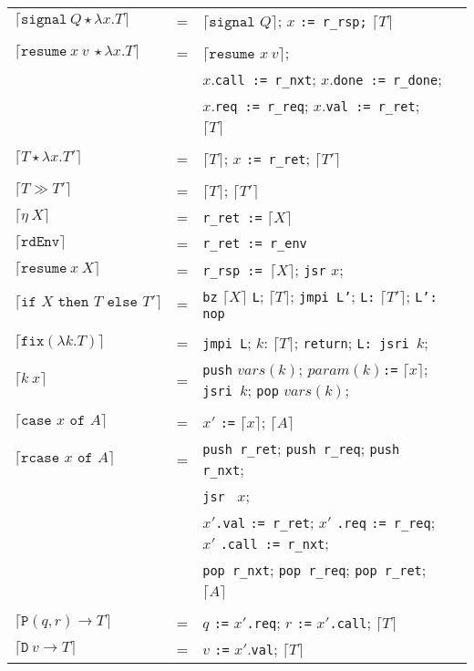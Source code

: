 \documentclass[a4paper,10pt]{article}
\begin{document}
\begin{tabular}[t]{llll}
$\lceil \texttt{signal}\ Q \star \lambda x . T\rceil$ &=& $\lceil \texttt{signal } Q \rceil$;
$x$ \texttt{:= r\_rsp;} $\lceil T \rceil$\\
\\
$\lceil \texttt{resume}\ x\ v\ \star \lambda x . T\rceil$ &=& $\lceil \texttt{resume } x\ v \rceil$;\\
&&$x$.\texttt{call := r\_nxt}; $x$.\texttt{done := r\_done};\\
&&$x$.\texttt{req := r\_req}; $x$.\texttt{val := r\_ret};\\
&&$\lceil T \rceil$\\
\\
$\lceil T \star \lambda x . T\prime \rceil$ &=& $\lceil T \rceil$; $x$ \texttt{:= r\_ret}; $\lceil T\prime \rceil$\\
\\
$\lceil T \gg T\prime \rceil$ &=& $\lceil T \rceil$; $\lceil T\prime \rceil$\\

$\lceil \eta\ X \rceil$ &=& \texttt{r\_ret :=} $\lceil X \rceil$\\
$\lceil \texttt{rdEnv} \rceil$ &=& \texttt{r\_ret := r\_env}\\
$\lceil \texttt{resume}\ x\ X\rceil$ &=& \texttt{r\_rsp := }$\lceil X \rceil$; \texttt{jsr} $x$;\\
$\lceil \texttt{if } X \texttt{ then } T \texttt{ else } T\prime \rceil$ &=&
\texttt{bz} $\lceil X \rceil$ \texttt{L}; $\lceil T \rceil$; \texttt{jmpi L'}; \texttt{L:} $\lceil T\prime \rceil$; \texttt{L': nop}\\
\\
$\lceil \texttt{fix} (\lambda k . T) \rceil$ &=& \texttt{jmpi L}; $k$: $\lceil T \rceil$; \texttt{return}; \texttt{L: jsri }$k$; \\

$\lceil k\ x\rceil$ &=& \texttt{push} $vars(k)$; $param(k)$\texttt{:=} $\lceil x \rceil$;  \texttt{jsri }$k$; \texttt{pop} $vars(k)$; \\
\\
$\lceil \texttt{case } x \texttt{ of } A\rceil$ &=& $x\prime$ \texttt{:=} $\lceil x \rceil$; $\lceil A \rceil$\\

$\lceil \texttt{rcase } x \texttt{ of } A\rceil$ &=& \texttt{push r\_ret}; \texttt{push r\_req};  \texttt{push r\_nxt};\\
&&\texttt{jsr } $x$;\\
&& $x\prime$\texttt{.val} \texttt{:= r\_ret}; $x\prime$ \texttt{.req} \texttt{:= r\_req}; $x\prime$ \texttt{.call := r\_nxt};\\
&&\texttt{pop r\_nxt}; \texttt{pop r\_req}; \texttt{pop r\_ret};\\
&&$\lceil A \rceil$\\
\\
$\lceil \texttt{P} (q, r) \rightarrow T \rceil$ &=& $q$ \texttt{:=} $x\prime$\texttt{.req}; $r$ \texttt{:=} $x\prime$\texttt{.call}; $\lceil T \rceil$\\

$\lceil \texttt{D}\ v \rightarrow T \rceil$ &=& $v$ \texttt{:=} $x\prime$.\texttt{val}; $\lceil T \rceil$\\


\end{tabular}
\end{document}
